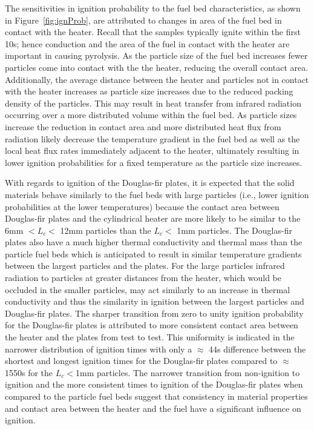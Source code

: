     The sensitivities in ignition probability to the fuel bed characteristics, as shown in Figure~\ref{fig:ignProb}, are attributed to changes in area of the fuel bed in contact with the heater. Recall that the samples typically ignite within the first 10\si{\second}; hence conduction and the area of the fuel in contact with the heater are important in causing pyrolysis. As the particle size of the fuel bed increases fewer particles come into contact with the the heater, reducing the overall contact area. Additionally, the average distance between the heater and particles not in contact with the heater increases as particle size increases due to the reduced packing density of the particles. This may result in heat transfer from infrared radiation occurring over a more distributed volume within the fuel bed. As particle sizes increase the reduction in contact area and more distributed heat flux from radiation likely decrease the temperature gradient in the fuel bed as well as the local heat flux rates immediately adjacent to the heater, ultimately resulting in lower ignition probabilities for a fixed temperature as the particle size increases. 
    
    
    With regards to ignition of the Douglas-fir plates, it is expected that the solid materials behave similarly to the fuel beds with large particles (i.e., lower ignition probabilities at the lower temperatures) because the contact area between Douglas-fir plates and the cylindrical heater are more likely to be similar to the 6mm $<L_{c}<$ 12mm particles than the $L_{c}<$ 1mm particles. The Douglas-fir plates also have a much higher thermal conductivity and thermal mass than the particle fuel beds which is anticipated to result in similar temperature gradients between the largest particles and the plates. For the large particles infrared radiation to particles at greater distances from the heater, which would be occluded in the smaller particles, may act similarly to an increase in thermal conductivity and thus the similarity in ignition between the largest particles and Douglas-fir plates. The sharper transition from zero to unity ignition probability for the Douglas-fir plates is attributed to more consistent contact area between the heater and the plates from test to test. This uniformity is indicated in the narrower distribution of ignition times with only a $\approx$ 44\si{\second} difference between the shortest and longest ignition times for the Douglas-fir plates compared to $\approx$ 1550\si{\second} for the $L_{c}<$1mm particles. The narrower transition from non-ignition to ignition and the more consistent times to ignition of the Douglas-fir plates when compared to the particle fuel beds suggest that consistency in material properties and contact area between the heater and the fuel have a significant influence on ignition. 
    
